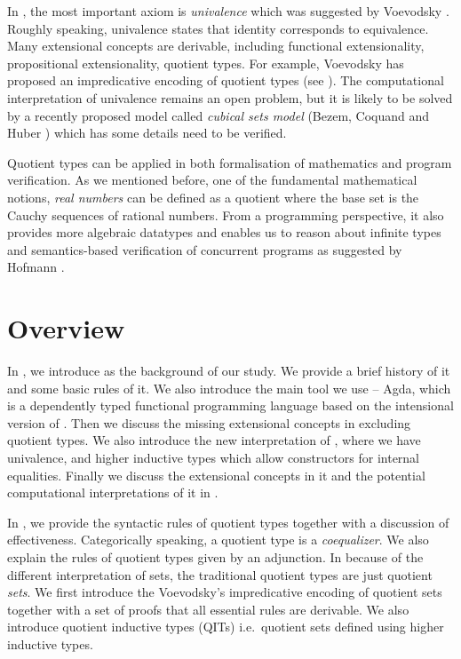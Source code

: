 
In \hott, the most important axiom is \emph{univalence} which was suggested by Voevodsky \cite{VV}. Roughly speaking, univalence states that identity corresponds to equivalence. Many extensional concepts are derivable, including functional extensionality, propositional extensionality, quotient types. For example, Voevodsky has proposed an impredicative encoding of quotient types (see ). The computational interpretation of univalence remains an open problem, but it is likely to be solved by a recently proposed model called \emph{cubical sets model} (Bezem, Coquand and Huber \cite{bezem2013model}) which has some details need to be verified.


Quotient types can be applied in both formalisation of mathematics and program verification. As we mentioned before, one of the fundamental mathematical notions, \emph{real numbers} can be defined as a quotient where the base set is the Cauchy sequences of rational numbers. 
From a programming perspective,  it also provides more algebraic
datatypes and enables us to reason about infinite types and
semantics-based verification of concurrent programs as suggested by Hofmann \cite{hof:phd}.


\section{Overview}



In , we introduce \mltt as the background of our study. We provide a brief
history of it and some basic rules of it.
We also introduce the main tool we use -- Agda, which is a dependently typed functional
programming language based on the intensional version of \mltt. Then we discuss the missing extensional concepts in \itt excluding quotient types. We also introduce the new interpretation of \hott, where we have univalence, and higher inductive types which allow constructors for internal equalities. Finally we discuss the extensional concepts in it and the potential computational interpretations of it in \itt.


In , we provide the syntactic rules of quotient types together with a discussion of effectiveness. Categorically speaking, a quotient type is a \emph{coequalizer}. We also explain the rules of quotient types given by an adjunction. In \hott because of the different interpretation of sets, the traditional quotient types are just quotient \emph{sets}. We first introduce the Voevodsky's impredicative encoding of quotient sets together with a set of proofs that all essential rules are derivable. We also introduce quotient inductive types (QITs) i.e.\ quotient sets defined using higher inductive types.
 

